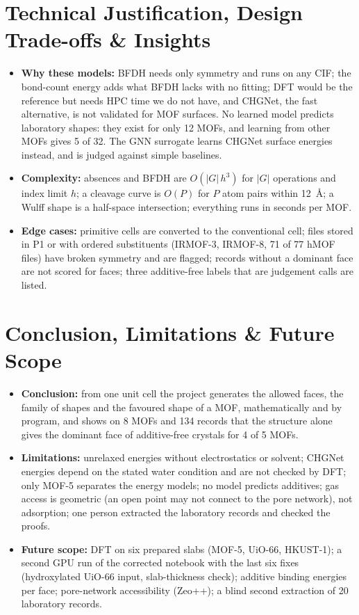 \documentclass[11pt, a4paper]{article}
\begin{document}
\section{Technical Justification, Design Trade-offs \& Insights}
\begin{itemize}[noitemsep, topsep=2pt]
    \item \textbf{Why these models:} BFDH needs only symmetry and runs on any CIF; the bond-count energy adds what BFDH lacks with no fitting; DFT would be the reference but needs HPC time we do not have, and CHGNet, the fast alternative, is not validated for MOF surfaces. No learned model predicts laboratory shapes: they exist for only 12 MOFs, and learning from other MOFs gives 5 of 32. The GNN surrogate learns CHGNet surface energies instead, and is judged against simple baselines.
    \item \textbf{Complexity:} absences and BFDH are $O(|G|\,h^3)$ for $|G|$ operations and index limit $h$; a cleavage curve is $O(P)$ for $P$ atom pairs within 12~\AA; a Wulff shape is a half-space intersection; everything runs in seconds per MOF.
    \item \textbf{Edge cases:} primitive cells are converted to the conventional cell; files stored in P1 or with ordered substituents (IRMOF-3, IRMOF-8, 71 of 77 hMOF files) have broken symmetry and are flagged; records without a dominant face are not scored for faces; three additive-free labels that are judgement calls are listed.
\end{itemize}

\section{Conclusion, Limitations \& Future Scope}
\begin{itemize}[noitemsep, topsep=2pt]
    \item \textbf{Conclusion:} from one unit cell the project generates the allowed faces, the family of shapes and the favoured shape of a MOF, mathematically and by program, and shows on 8 MOFs and 134 records that the structure alone gives the dominant face of additive-free crystals for 4 of 5 MOFs.
    \item \textbf{Limitations:} unrelaxed energies without electrostatics or solvent; CHGNet energies depend on the stated water condition and are not checked by DFT; only MOF-5 separates the energy models; no model predicts additives; gas access is geometric (an open point may not connect to the pore network), not adsorption; one person extracted the laboratory records and checked the proofs.
    \item \textbf{Future scope:} DFT on six prepared slabs (MOF-5, UiO-66, HKUST-1); a second GPU run of the corrected notebook with the last six fixes (hydroxylated UiO-66 input, slab-thickness check); additive binding energies per face; pore-network accessibility (Zeo++); a blind second extraction of 20 laboratory records.
\end{itemize}
\end{document}

